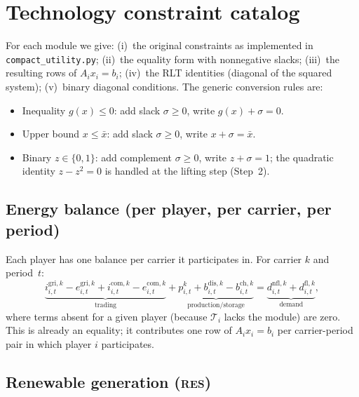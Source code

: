 \documentclass[11pt]{article}
\theoremstyle{definition}
\newcommand{\Tech}{\mathcal{T}}
\begin{document}
\section{Technology constraint catalog}
\label{sec:catalog}

For each module we give: (i)~the original constraints as implemented in
\texttt{compact\_utility.py}; (ii)~the equality form with nonnegative
slacks; (iii)~the resulting rows of $A_ix_i=b_i$; (iv)~the RLT
identities (diagonal of the squared system); (v)~binary diagonal
conditions.  The generic conversion rules are:
\begin{itemize}[leftmargin=1.2em]
\item Inequality $g(x)\le 0$: add slack $\sigma\ge0$, write
  $g(x)+\sigma=0$.
\item Upper bound $x\le\bar x$: add slack $\sigma\ge0$, write
  $x+\sigma=\bar x$.
\item Binary $z\in\{0,1\}$: add complement $\sigma\ge0$, write
  $z+\sigma=1$; the quadratic identity $z-z^2=0$ is handled at the
  lifting step (Step~2).
\end{itemize}

\subsection{Energy balance (per player, per carrier, per period)}
\label{sec:balance}

Each player has one balance per carrier it participates in.  For carrier
$k$ and period~$t$:
\begin{equation}
\underbrace{i^{\mathrm{gri},k}_{i,t}-e^{\mathrm{gri},k}_{i,t}
+i^{\mathrm{com},k}_{i,t}-e^{\mathrm{com},k}_{i,t}}_{\text{trading}}
+\underbrace{p^{k}_{i,t}+b^{\mathrm{dis},k}_{i,t}
  -b^{\mathrm{ch},k}_{i,t}}_{\text{production/storage}}
=\underbrace{d^{\mathrm{nfl},k}_{i,t}+d^{\mathrm{fl},k}_{i,t}}_{\text{demand}},
\label{eq:energy-balance}
\end{equation}
where terms absent for a given player (because $\Tech_i$ lacks the
module) are zero.  This is already an equality; it contributes one row
of $A_ix_i=b_i$ per carrier-period pair in which player $i$ participates.

\subsection{Renewable generation (\textsc{res})}
\label{sec:res}
\end{document}
